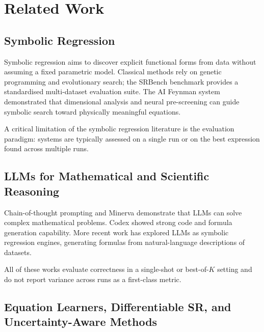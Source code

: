 \documentclass[twoside,11pt]{article}
\begin{document}
\section{Related Work}
\label{sec:related}

\subsection{Symbolic Regression}\label{subsec:symbolic-regression}
\label{sec:related_sr}

Symbolic regression aims to discover explicit functional forms from data without
assuming a fixed parametric model.  Classical methods rely on genetic programming
\citep{koza1992genetic} and evolutionary search; the SRBench benchmark \citep{lacava2021contemporary}
provides a standardised multi-dataset evaluation suite.  The AI Feynman
system \citep{udrescu2020ai} demonstrated that dimensional analysis and neural
pre-screening can guide symbolic search toward physically meaningful equations.

A critical limitation of the symbolic regression literature is the evaluation
paradigm: systems are typically assessed on a single run or on the best expression
found across multiple runs. 

\subsection{LLMs for Mathematical and Scientific Reasoning}\label{subsec:llms-for-mathematical-and-scientific-rea}
\label{sec:related_llm}

Chain-of-thought prompting \citep{wei2022chain} and Minerva \citep{lewkowycz2022minerva}
demonstrate that LLMs can solve complex mathematical problems.  Codex \citep{chen2021evaluating}
showed strong code and formula generation capability.  More recent work has explored
LLMs as symbolic regression engines, generating formulas from natural-language
descriptions of datasets.

All of these works evaluate correctness in a single-shot or best-of-$K$ setting and
do not report variance across runs as a first-class metric. 

\subsection{Equation Learners, Differentiable SR, and Uncertainty-Aware Methods}\label{subsec:equation-learners-differentiable-sr-and-}
\label{sec:related_eq}
\end{document}
